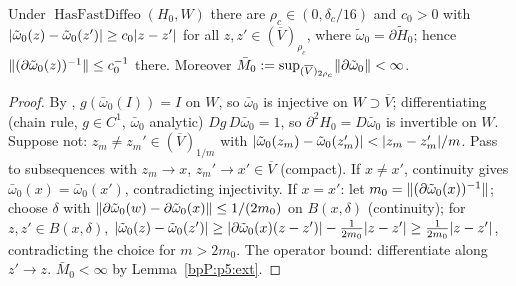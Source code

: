 \begin{lemma}\label{bpP:p5:bilip}
Under $\operatorname{HasFastDiffeo}(H_0,W)$ there are $\rho_c\in(0,\delta_c/16)$ and $c_0>0$ with $\lvert \tilde\omega_0(z)-\tilde\omega_0(z')\rvert\ge c_0\lvert z-z'\rvert$ for all $z,z'\in(\overline V)_{\rho_c}$, where $\tilde\omega_0=\partial\tilde H_0$; hence $\lVert (\partial\tilde\omega_0(z))^{-1}\rVert\le c_0^{-1}$ there. Moreover $\bar M_0:=\sup_{(\overline V)_{2\rho_c}}\lVert \partial\tilde\omega_0\rVert<\infty$.
\end{lemma}
\begin{proof}
\label{stepP:p5:bl-real} By , $g(\bar\omega_0(I))=I$ on $W$, so $\bar\omega_0$ is injective on $W\supset\overline V$; differentiating (chain rule, $g\in C^1$, $\bar\omega_0$ analytic) $Dg\,D\bar\omega_0=1$, so $\partial^2H_0=D\bar\omega_0$ is invertible on $W$.
\label{stepP:p5:bl-comp} Suppose not: $z_m\ne z_m'\in(\overline V)_{1/m}$ with $\lvert \tilde\omega_0(z_m)-\tilde\omega_0(z_m')\rvert<\lvert z_m-z_m'\rvert/m$. Pass to subsequences with $z_m\to x$, $z_m'\to x'\in\overline V$ (compact). If $x\ne x'$, continuity gives $\bar\omega_0(x)=\bar\omega_0(x')$, contradicting injectivity. If $x=x'$: let $m_0=\lVert (\partial\tilde\omega_0(x))^{-1}\rVert$; choose $\delta$ with $\lVert \partial\tilde\omega_0(w)-\partial\tilde\omega_0(x)\rVert\le1/(2m_0)$ on $B(x,\delta)$ (continuity); for $z,z'\in B(x,\delta)$, $\lvert \tilde\omega_0(z)-\tilde\omega_0(z')\rvert\ge\lvert \partial\tilde\omega_0(x)(z-z')\rvert-\frac1{2m_0}\lvert z-z'\rvert\ge\frac1{2m_0}\lvert z-z'\rvert$, contradicting the choice for $m>2m_0$. The operator bound: differentiate along $z'\to z$. $\bar M_0<\infty$ by Lemma~\ref{bpP:p5:ext}.
\end{proof}

